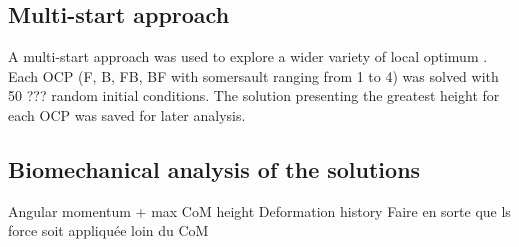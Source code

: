 \subsection{Multi-start approach}\label{subsec:2f}
A multi-start approach was used to explore a wider variety of local optimum \cite{huchez2015local}.
Each OCP (F, B, FB, BF with somersault ranging from 1 to 4) was solved with 50 ??? random initial conditions.
The solution presenting the greatest height for each OCP was saved for later analysis.


\subsection{Biomechanical analysis of the solutions}\label{subsec:2g}
Angular momentum + max CoM height
Deformation history
Faire en sorte que ls force soit appliquée loin du CoM





